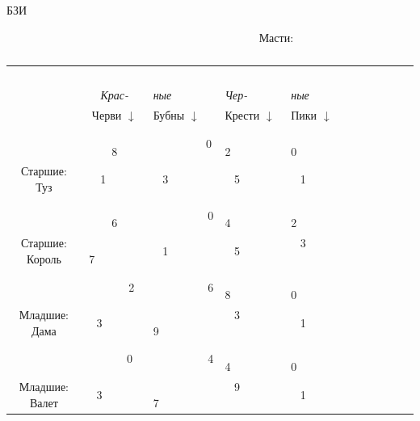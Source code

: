 \begin{problem}
\begin{source}
БЗИ
\end{source}
 \begin{table}[!htbp]  \caption{}
~~~~~~~~~~~~~~~~~~~~~~~~~~~~~~~~~~~~~~~~~~~~ Масти:  \\
{\begin{tabular}{cc|l|l|l|l}
               &      &             &~~~          &    &     \\
               &     {\em Крас- }      &  {\em ные }      &  {\em Чер-}     &  {\em ные }  &      \\
\cline{2-5}%
               & Черви $\downarrow$ &   Бубны $\downarrow$ & Крести $\downarrow$ &     Пики $
\downarrow$ &            \\
\cline{2-5}%
             ~~~   &~~~ ~~~~~ 8 &~~~ ~~~~~ 0 &~~~~~~~~~  2 &~~~~~~~~~  0 &~~~~~~~~~   \\
   Старшие: Туз &~  1~~~ ~~&~ 3~~~ ~~ &~ 5         ~&~ 1        ~&~         \\
\cline{2-5}%
                 &~~~ ~~~~~ 6&~~~~~~~~~ 0  &~~~~~~~~~  4 &~~~~~~~~~  2 &~~~~~~~~~   \\
   Старшие: Король &~ 7~~~~~~~~&~ 1~~~~~~~~  &~ 5~~~~ ~~ &~ 3~ ~~~~~~ &~  ~ \\
\cline{2-5}%
                 &~ ~~ ~~ 2~&~~~~~~~~~ 6  &~~~~~~~~~  8 &~~~~~~~~~  0 &~~~~~~~~~   \\
   Младшие:  Дама &~ 3~~~~~~~&~ 9~~~~~~~~~ &~  3~~~~~ ~~ &~ 1~~~~~~~ &~  ~~~~~ \\
\cline{2-5}%
\cline{2-5}%
                  &~ ~~~ ~0~&~~~~~~~~~ 4  &~~~~~~~~~ 4 &~~~~~~~~~ 0  &~~~~~~~~~   \\
 Младшие:  Валет  &~ 3~~~~~~~&~ 7~~~~~~~~~ &~ 9~~~~~ ~~ &~ 1~~~~~~~ &~  ~~~~~~~ \\
\cline{2-5}%
\end{tabular}}\label{cards}
\end{table}


\end{problem}
